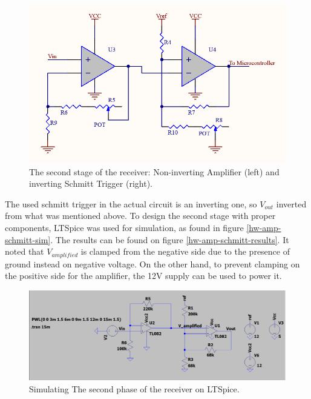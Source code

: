 \begin{figure}[h!]
	\centering
	\includegraphics[scale=0.3]{Figures/HW/amp-schmitt.png}
	\caption{The second stage of the receiver: Non-inverting Amplifier (left) and inverting Schmitt Trigger (right).}
	\label{fig:hw-amp-schmitt}
\end{figure}

The used schmitt trigger in the actual circuit is an inverting one, so $V_{out}$ inverted from what was mentioned above. To design the second stage with proper components, LTSpice was used for simulation, as found in figure \ref{hw-amp-schmitt-sim}. The results can be found on figure \ref{hw-amp-schmitt-results}. It noted that $V_{amplified}$ is clamped from the negative side due to the presence of ground instead on negative voltage. On the other hand, to prevent clamping on the positive side for the amplifier, the 12V supply can be used to power it.

\begin{figure}[h!]
	\centering
	\includegraphics[scale=0.3]{Figures/HW/amp-schmitt-ltspice.png}
	\caption{Simulating The second phase of the receiver on LTSpice.}
	\label{fig:hw-amp-schmitt-sim}
\end{figure}

